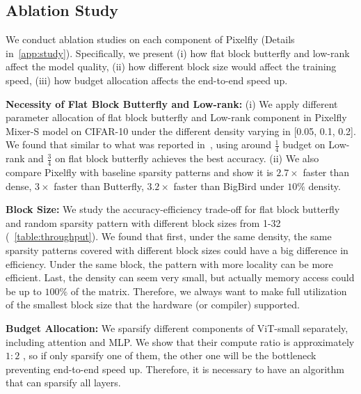\subsection{Ablation Study}
\label{exp:ablation}
We conduct ablation studies on each component of Pixelfly (Details in~\cref{app:study}). Specifically, we present (i) how flat block butterfly and low-rank affect the model quality, (ii) how different block size would affect the training speed, (iii) how budget allocation affects the end-to-end speed up.

\textbf{Necessity of Flat Block Butterfly and Low-rank:} (i) We apply different parameter allocation of flat block butterfly and Low-rank component in Pixelfly Mixer-S model on CIFAR-10 under the different density varying in [0.05, 0.1, 0.2]. We found that similar to what was reported in~\citep{scatterbrain}, using around $\frac{1}{4}$ budget on Low-rank and $\frac{3}{4}$ on flat block butterfly achieves the best accuracy. (ii) We also compare Pixelfly with baseline sparsity patterns and show it is $2.7\times$ faster than dense, $3\times$ faster than Butterfly, $3.2\times$ faster than BigBird under $10\%$ density.

\textbf{Block Size:} We study the accuracy-efficiency trade-off for flat block butterfly and random sparsity pattern with different block sizes from 1-32 (~\cref{table:throughput}). We found that first, under the same density, the same sparsity patterns covered with different block sizes could have a big difference in efficiency. 
Under the same block, the pattern with more locality can be more efficient. 
Last, the density can seem very small, but actually memory access could be up to $100\%$ of the matrix. 
Therefore, we always want to make full utilization of the smallest block size that the hardware (or compiler) supported.   

\textbf{Budget Allocation:} We sparsify different components of ViT-small separately, including attention and MLP. We show that their compute ratio is approximately $1:2$ , so if only sparsify one of them, the other one will be the bottleneck preventing end-to-end speed up. Therefore, it is necessary to have an algorithm that can sparsify all layers. 










  








